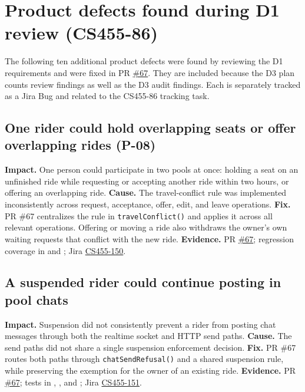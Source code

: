 \documentclass[10pt]{article}
\begin{document}
\section{Product defects found during D1 review (CS455-86)}
The following ten additional product defects were found by reviewing the D1 requirements and were fixed in PR \href{https://github.com/CS455-Carpooling/Campus_Ridepooling_Automation/pull/67}{\#67}. They are included because the D3 plan counts review findings as well as the D3 audit findings. Each is separately tracked as a Jira Bug and related to the CS455-86 tracking task.

\subsection{One rider could hold overlapping seats or offer overlapping rides (P-08)}
\textbf{Impact.} One person could participate in two pools at once: holding a seat on an unfinished ride while requesting or accepting another ride within two hours, or offering an overlapping ride.
\textbf{Cause.} The travel-conflict rule was implemented inconsistently across request, acceptance, offer, edit, and leave operations.
\textbf{Fix.} PR \#67 centralizes the rule in \texttt{travelConflict()} and applies it across all relevant operations. Offering or moving a ride also withdraws the owner's own waiting requests that conflict with the new ride.
\textbf{Evidence.} PR \href{https://github.com/CS455-Carpooling/Campus_Ridepooling_Automation/pull/67}{\#67}; regression coverage in  and ; Jira \href{https://cs455project.atlassian.net/browse/CS455-150}{CS455-150}.

\subsection{A suspended rider could continue posting in pool chats}
\textbf{Impact.} Suspension did not consistently prevent a rider from posting chat messages through both the realtime socket and HTTP send paths.
\textbf{Cause.} The send paths did not share a single suspension enforcement decision.
\textbf{Fix.} PR \#67 routes both paths through \texttt{chatSendRefusal()} and a shared suspension rule, while preserving the exemption for the owner of an existing ride.
\textbf{Evidence.} PR \href{https://github.com/CS455-Carpooling/Campus_Ridepooling_Automation/pull/67}{\#67}; tests in , , and ; Jira \href{https://cs455project.atlassian.net/browse/CS455-151}{CS455-151}.
\end{document}
